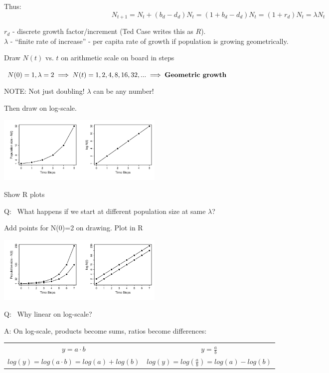 \documentclass{article}
\newcommand{\note}[1]{\colorbox{gray!20}{#1}}
\begin{document}
Thus:
\begin{equation*}
	N_{t+1}=N_t+(b_d-d_d)N_t=(1+b_d-d_d)N_t=(1+r_d)N_t=\lambda N_t
\end{equation*}

$r_d$ - discrete growth factor/increment (Ted Case writes this as $R$).\\
$\lambda$ - “finite rate of increase” - per capita rate of growth if population is growing geometrically.


\vspace{1cm}

\note{Draw $N(t)$ vs. $t$ on arithmetic scale on board in steps}
\begin{center}
$N(0)=1, \lambda=2 \implies N(t)=1,2,4,8,16,32,... \implies \text{\textbf{Geometric growth}}$
\end{center}
NOTE:  Not just doubling!  $\lambda$ can be any number!

\note{Then draw on log-scale.}
\begin{center}
\includegraphics[width=8cm]{figs/image}
\end{center}

\note{Show R plots}

\note{Q:}  What happens if we start at different population size at same $\lambda$?

\note{Add points for N(0)=2 on drawing. Plot in R}
\begin{center}
\includegraphics[width=8cm]{figs/image0}
\end{center}

\note{Q:}  Why linear on log-scale?

\note{A:} On log-scale, products become sums, ratios become differences:
\begin{center}
  \begin{tabular}{c|c}
  $y=a \cdot b $ & $y=\frac{a}{b}$  \\
  $log(y)=log(a \cdot b) = log(a) + log (b)$ & $log(y)=log\left(\frac{a}{b}\right )=log(a)-log(b)$
  \end{tabular}
\end{center}
\end{document}
